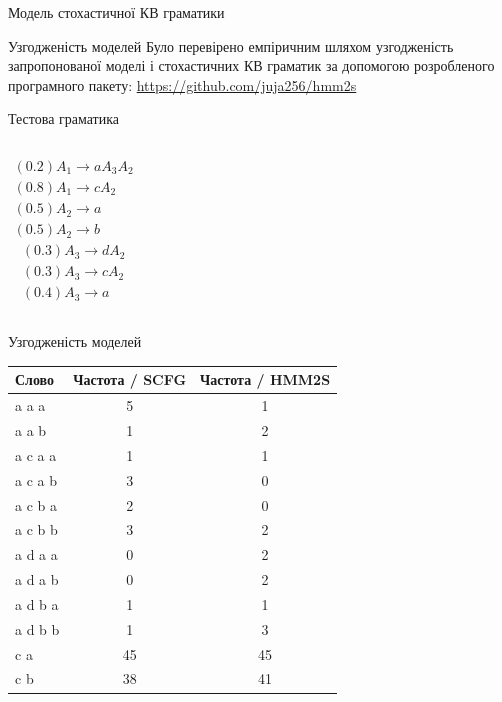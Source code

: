 \documentclass{beamer}
\begin{document}
\begin{darkframes}
\begin{frame}{Модель стохастичної КВ граматики}
    \end{frame}

    \begin{frame}{Узгодженість моделей}
      Було перевірено емпіричним шляхом узгодженість запропонованої моделі і стохастичних КВ граматик за допомогою розробленого програмного пакету: \url{https://github.com/juja256/hmm2s}
      \begin{alertblock}{Тестова граматика}
        \begin{columns}[onlytextwidth]
          \begin{align*}
            (0.2) A_1 \rightarrow a A_3 A_2 \\
            (0.8) A_1 \rightarrow c A_2 \\
            (0.5) A_2 \rightarrow a \\
            (0.5) A_2 \rightarrow b
          \end{align*}
          \begin{align*}
            (0.3) A_3 \rightarrow d A_2 \\
            (0.3) A_3 \rightarrow c A_2 \\
            (0.4) A_3 \rightarrow a
          \end{align*}
        \end{columns}

      \end{alertblock}
    \end{frame}

    \begin{frame}{Узгодженість моделей}
      \begin{table}[!b]
        {\carlitoTLF %
        \begin{tabularx}{\textwidth}{Xcc}
          \textbf{Слово} & \textbf{Частота / SCFG} & \textbf{Частота / HMM2S} \\
          \toprule
          a a a & 5 & 1 \\
          a a b & 1 & 2 \\
          a c a a & 1 & 1 \\
          a c a b & 3 & 0 \\
          a c b a & 2 & 0 \\
          a c b b & 3 & 2 \\
          a d a a & 0 & 2 \\
          a d a b & 0 & 2 \\
          a d b a & 1 & 1 \\
          a d b b & 1 & 3 \\
          c a & 45 & 45 \\
          c b & 38 & 41
        \end{tabularx}}

      \end{table}

    \end{frame}

  \end{darkframes}
\end{document}

